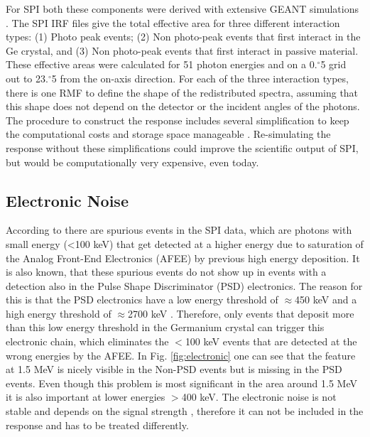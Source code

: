 \documentclass[twocolumn,traditabstract]{aa}
\def\fdg{\hbox{$.\!\!^\circ$}}          %
\begin{document}
For SPI both these components were derived with extensive GEANT simulations \citep{spi_response}.
The SPI IRF files give the total effective area for three different interaction types:
 (1) Photo peak events;
 (2) Non photo-peak events that first interact in the Ge crystal, and
 (3) Non photo-peak events that first interact in passive material.
These effective areas were calculated for 51 photon energies and on a 0\fdg5  grid out to 23\fdg5 from the on-axis direction. For each of the three interaction types, there is one RMF to define the shape of the redistributed spectra, assuming that this shape does not depend on the detector or the incident angles of the photons. The procedure to construct the response includes several simplification to keep the computational costs and storage space manageable \citep{spi_response}. Re-simulating the response without these simplifications could improve the scientific output of SPI, but would be computationally very expensive, even today.


\subsection{Electronic Noise}
\label{electronic}
According to \citet{spi_electronic_noise} there are spurious events in the SPI data, which are photons with small energy (<100 keV) that get detected at a higher energy due to saturation of the Analog Front-End Electronics (AFEE) by previous high energy deposition. It is also known, that these spurious events do not show up in events with a detection also in the Pulse Shape Discriminator (PSD) electronics. The reason for this is that the PSD electronics have a low energy threshold of $\approx$450 keV and a high energy threshold of $\approx$2700 keV \citep[the exact values have been changed a few times during the mission; ][]{spi_electronic_noise}. Therefore, only events that deposit more than this low energy threshold in the Germanium crystal can trigger this electronic chain, which eliminates the $<$100 keV events that are detected at the wrong energies by the AFEE. In Fig. \ref{fig:electronic} one can see that the feature at 1.5 MeV is nicely visible in the Non-PSD events but is missing in the PSD events. Even though this problem is most significant in the area around 1.5 MeV it is also important at lower energies $>$400 keV. The electronic noise is not stable and depends on the signal strength \citep{spi_electronic_noise}, therefore it can not be included in the response and has to be treated differently.
\end{document}
